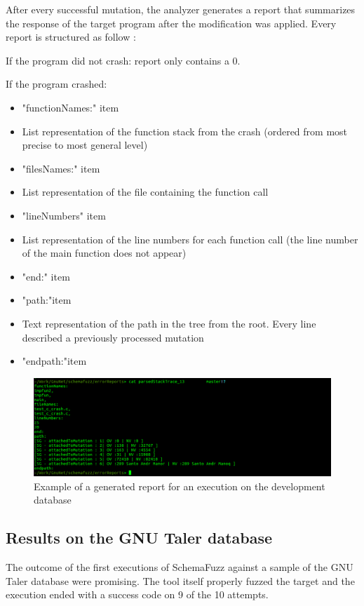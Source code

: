 \documentclass{article}
\begin{document}
\begin{empfile}
After every successful mutation, the analyzer generates a report that summarizes the response of the target program after the modification was applied.
Every report is structured as follow :

If the program did not crash: report only contains a 0.
	

If the program crashed:
		\begin{itemize}
		\item{"functionNames:" item}
		\item{List representation of the function stack from the crash (ordered from most precise to most general level) }
		\item{"filesNames:" item}
		\item{List representation of the file containing the function call}
		\item{"lineNumbers" item}
		\item{List representation of the line numbers for each function call (the line number of the main function does not appear)}
		\item{"end:" item}
		\item{"path:"item}
		\item{Text representation of the path in the tree from the root. Every line described a previously processed mutation}
		\item{"endpath:"item}
		\end{itemize}
	
		\bigskip
		\begin{figure} [h!]
			\includegraphics[width=\textwidth]{sc1.png}
			\caption{Example of a generated report for an execution on the development database }
		\end{figure}
		\bigskip
		
		\subsection{Results on the GNU Taler database}

The outcome of the first executions of SchemaFuzz against a sample of the GNU Taler database were promising. The tool itself properly fuzzed the target and the execution ended with a success
code on 9 of the 10 attempts. 		
	

\end{empfile}
\end{document}
